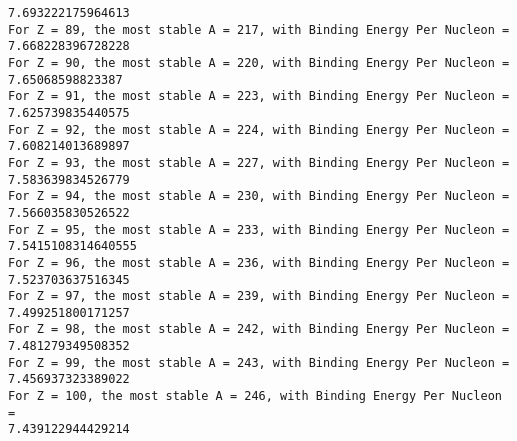 \documentclass[11pt]{article}
\makeatletter
\newcommand{\boxspacing}{\kern\kvtcb@left@rule\kern\kvtcb@boxsep}
\newcommand{\prompt}[4]{
        {\ttfamily\llap{{\color{#2}[#3]:\hspace{3pt}#4}}\vspace{-\baselineskip}}
    }
\makeatother
\begin{document}
\begin{Verbatim}[commandchars=\\\{\}]
7.693222175964613
For Z = 89, the most stable A = 217, with Binding Energy Per Nucleon =
7.668228396728228
For Z = 90, the most stable A = 220, with Binding Energy Per Nucleon =
7.65068598823387
For Z = 91, the most stable A = 223, with Binding Energy Per Nucleon =
7.625739835440575
For Z = 92, the most stable A = 224, with Binding Energy Per Nucleon =
7.608214013689897
For Z = 93, the most stable A = 227, with Binding Energy Per Nucleon =
7.583639834526779
For Z = 94, the most stable A = 230, with Binding Energy Per Nucleon =
7.566035830526522
For Z = 95, the most stable A = 233, with Binding Energy Per Nucleon =
7.5415108314640555
For Z = 96, the most stable A = 236, with Binding Energy Per Nucleon =
7.523703637516345
For Z = 97, the most stable A = 239, with Binding Energy Per Nucleon =
7.499251800171257
For Z = 98, the most stable A = 242, with Binding Energy Per Nucleon =
7.481279349508352
For Z = 99, the most stable A = 243, with Binding Energy Per Nucleon =
7.456937323389022
For Z = 100, the most stable A = 246, with Binding Energy Per Nucleon =
7.439122944429214
    \end{Verbatim}

    \begin{tcolorbox}[breakable, size=fbox, boxrule=1pt, pad at break*=1mm,colback=cellbackground, colframe=cellborder]
\prompt{In}{incolor}{ }{\boxspacing}
\begin{Verbatim}[commandchars=\\\{\}]

\end{Verbatim}
\end{tcolorbox}


    
    
    
\end{document}
